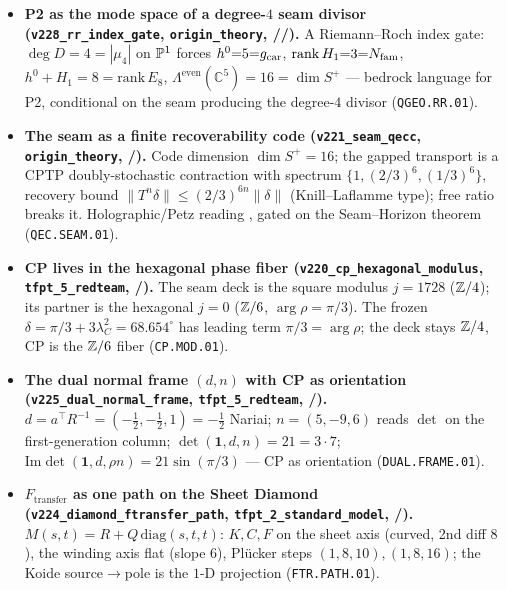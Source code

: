 \begin{itemize}
  $128{=}\mathrm{rank}\cdot\dim S^+$ (phase/glue channel); the red-team Target~D magnitude bijection
  lives in $120$, the un-covered CP phases in $128$; the dark-sector reading of $128$ stays Frontier
  (replaces the over-strong $S^-$ reading; \texttt{E8.CHAN.01}).
\item \textbf{P2 as the mode space of a degree-$4$ seam divisor (\texttt{v228\_rr\_index\_gate},
  \texttt{origin\_theory}, \mE/\mC/\mO).} A Riemann--Roch index gate: $\deg D{=}4{=}|\mu_4|$ on $\mathbb{P}^1$
  forces $h^0{=}5{=}g_{\mathrm{car}}$, $\mathrm{rank}\,H_1{=}3{=}N_{\mathrm{fam}}$, $h^0{+}H_1{=}8{=}\mathrm{rank}\,E_8$,
  $\Lambda^{\mathrm{even}}(\mathbb C^5){=}16{=}\dim S^+$ --- bedrock language for P2, conditional on the
  seam producing the degree-$4$ divisor (\texttt{QGEO.RR.01}).
\item \textbf{The seam as a finite recoverability code (\texttt{v221\_seam\_qecc},
  \texttt{origin\_theory}, \mE/\mC).} Code dimension $\dim S^+{=}16$; the gapped transport is a CPTP
  doubly-stochastic contraction with spectrum $\{1,(2/3)^6,(1/3)^6\}$, recovery bound
  $\|T^n\delta\|{\le}(2/3)^{6n}\|\delta\|$ (Knill--Laflamme type); free ratio breaks it. Holographic/Petz
  reading \mC, gated on the Seam--Horizon theorem (\texttt{QEC.SEAM.01}).
\item \textbf{CP lives in the hexagonal phase fiber (\texttt{v220\_cp\_hexagonal\_modulus},
  \texttt{tfpt\_5\_redteam}, \mE/\mC).} The seam deck is the square modulus $j{=}1728$ ($\mathbb{Z}/4$); its
  partner is the hexagonal $j{=}0$ ($\mathbb{Z}/6$, $\arg\rho{=}\pi/3$). The frozen $\delta{=}\pi/3{+}3\lambda_C^2
  {=}68.654^\circ$ has leading term $\pi/3{=}\arg\rho$; the deck stays $\mathbb{Z}/4$, CP is the $\mathbb{Z}/6$ fiber
  (\texttt{CP.MOD.01}).
\item \textbf{The dual normal frame $(d,n)$ with CP as orientation (\texttt{v225\_dual\_normal\_frame},
  \texttt{tfpt\_5\_redteam}, \mE/\mC).} $d{=}a^\top R^{-1}{=}({-}\tfrac12,{-}\tfrac12,1){=}{-}\tfrac12$
  Nariai; $n{=}(5,{-}9,6)$ reads $\det$ on the first-generation column; $\det(\mathbf1,d,n){=}21{=}3{\cdot}7$;
  $\mathrm{Im}\det(\mathbf1,d,\rho n){=}21\sin(\pi/3)$ --- CP as orientation (\texttt{DUAL.FRAME.01}).
\item \textbf{$F_{\mathrm{transfer}}$ as one path on the Sheet Diamond (\texttt{v224\_diamond\_ftransfer\_path},
  \texttt{tfpt\_2\_standard\_model}, \mE/\mC).} $M(s,t){=}R{+}Q\,\mathrm{diag}(s,t,t)$: $K,C,F$ on the
  sheet axis (curved, 2nd diff $8$), the winding axis flat (slope $6$), Pl\"ucker steps $(1,8,10),(1,8,16)$;
  the Koide source$\to$pole is the $1$-D projection (\texttt{FTR.PATH.01}).

\end{itemize}

